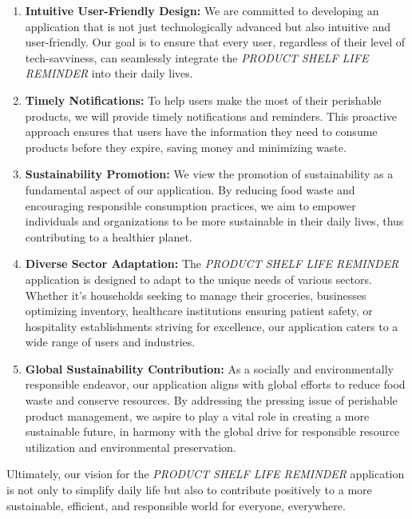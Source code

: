 \begin{enumerate}
    \item \textbf{Intuitive User-Friendly Design:} We are committed to developing an application that is not just technologically advanced but also intuitive and user-friendly. Our goal is to ensure that every user, regardless of their level of tech-savviness, can seamlessly integrate the \textit{PRODUCT SHELF LIFE REMINDER} into their daily lives.
    
    \item \textbf{Timely Notifications:} To help users make the most of their perishable products, we will provide timely notifications and reminders. This proactive approach ensures that users have the information they need to consume products before they expire, saving money and minimizing waste.
    
    \item \textbf{Sustainability Promotion:} We view the promotion of sustainability as a fundamental aspect of our application. By reducing food waste and encouraging responsible consumption practices, we aim to empower individuals and organizations to be more sustainable in their daily lives, thus contributing to a healthier planet.
    
    \item \textbf{Diverse Sector Adaptation:} The \textit{PRODUCT SHELF LIFE REMINDER} application is designed to adapt to the unique needs of various sectors. Whether it's households seeking to manage their groceries, businesses optimizing inventory, healthcare institutions ensuring patient safety, or hospitality establishments striving for excellence, our application caters to a wide range of users and industries.
    
    \item \textbf{Global Sustainability Contribution:} As a socially and environmentally responsible endeavor, our application aligns with global efforts to reduce food waste and conserve resources. By addressing the pressing issue of perishable product management, we aspire to play a vital role in creating a more sustainable future, in harmony with the global drive for responsible resource utilization and environmental preservation.
\end{enumerate}

Ultimately, our vision for the \textit{PRODUCT SHELF LIFE REMINDER} application is not only to simplify daily life but also to contribute positively to a more sustainable, efficient, and responsible world for everyone, everywhere.

